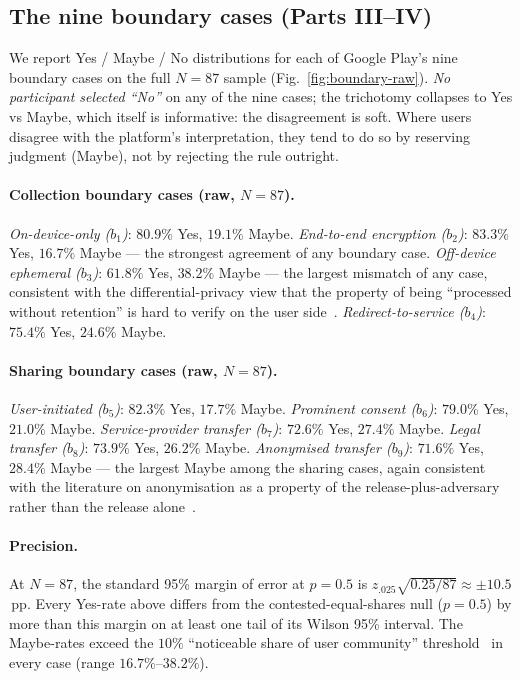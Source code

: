 \documentclass[11pt,a4paper]{article}
\begin{document}


\subsection{The nine boundary cases (Parts III--IV)}
\label{sec:results-bc}

We report Yes / Maybe / No distributions for each of Google Play's
nine boundary cases on the full $N{=}87$ sample
(Fig.~\ref{fig:boundary-raw}). \emph{No participant selected
``No''} on any of the nine cases; the trichotomy collapses to Yes
vs Maybe, which itself is informative: the disagreement is
soft. Where users disagree with the platform's interpretation,
they tend to do so by reserving judgment (Maybe), not by rejecting
the rule outright.



\paragraph{Collection boundary cases (raw, $N=87$).}
\emph{On-device-only ($b_1$)}: $80.9\%$ Yes, $19.1\%$ Maybe.
\emph{End-to-end encryption ($b_2$)}: $83.3\%$ Yes, $16.7\%$ Maybe
--- the strongest agreement of any boundary case.
\emph{Off-device ephemeral ($b_3$)}: $61.8\%$ Yes, $38.2\%$ Maybe
--- the largest mismatch of any case, consistent with
the differential-privacy view that the property of being
``processed without retention'' is hard to verify on the user
side~\citep{dwork:roth:2014,nissim:wood:2018}.
\emph{Redirect-to-service ($b_4$)}: $75.4\%$ Yes, $24.6\%$ Maybe.

\paragraph{Sharing boundary cases (raw, $N=87$).}
\emph{User-initiated ($b_5$)}: $82.3\%$ Yes, $17.7\%$ Maybe.
\emph{Prominent consent ($b_6$)}: $79.0\%$ Yes, $21.0\%$ Maybe.
\emph{Service-provider transfer ($b_7$)}: $72.6\%$ Yes, $27.4\%$
Maybe.
\emph{Legal transfer ($b_8$)}: $73.9\%$ Yes, $26.2\%$ Maybe.
\emph{Anonymised transfer ($b_9$)}: $71.6\%$ Yes, $28.4\%$ Maybe ---
the largest Maybe among the sharing cases, again consistent with
the literature on anonymisation as a property of the
release-plus-adversary rather than the release
alone~\citep{nissim:wood:2018,dwork:roth:2014}.

\paragraph{Precision.}
At $N{=}87$, the standard 95\% margin of error at $p{=}0.5$ is
$z_{.025}\sqrt{0.25/87}\approx \pm 10.5$\,pp. Every Yes-rate above
differs from the contested-equal-shares null ($p{=}0.5$) by more
than this margin on at least one tail of its Wilson 95\% interval.
The Maybe-rates exceed the $10\%$ ``noticeable share of user
community'' threshold~\citep{redmiles:etal:2017} in every case
(range $16.7\%$--$38.2\%$).
\end{document}
